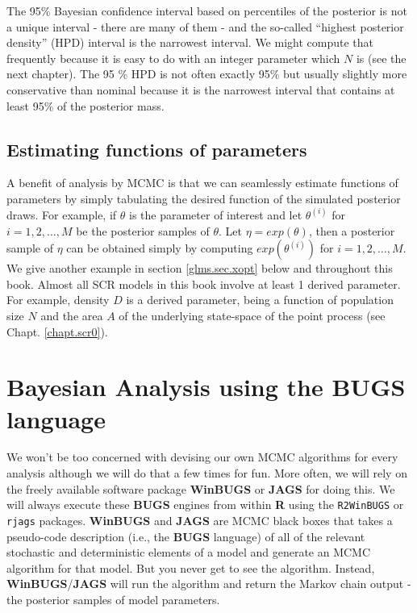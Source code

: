 The 95\% Bayesian confidence interval based on percentiles of the posterior
is not a unique interval - there are many of them - and the so-called
``highest posterior density'' (HPD) interval is the narrowest
interval. We might compute that frequently because it is easy to do
with an integer parameter which $N$ is (see the next chapter). The
95 \% HPD is not often exactly 95\% but usually slightly more
conservative than nominal because it is the narrowest interval that
contains at least 95\%  of the posterior mass.

\subsection{Estimating functions of parameters}

A benefit of analysis by MCMC is that we can seamlessly estimate
functions of parameters by simply tabulating the desired function of
the simulated posterior draws. For example, if $\theta$ is the
parameter of interest and let $\theta^{(i)}$ for $i=1,2,\ldots,M$ be
the posterior samples of $\theta$. Let $\eta = exp(\theta)$, then a
posterior sample of $\eta$ can be obtained simply by computing
$exp(\theta^{(i)})$ for $i=1,2,\ldots,M$. We give another example in
section
\ref{glms.sec.xopt}
below and throughout this book.
Almost all SCR models in this book involve at least 1 derived
parameter. For example, density $D$ is a derived parameter, being a
function of population size $N$ and the area $A$ of the underlying
state-space of the point process (see Chapt. \ref{chapt.scr0}).

\section{Bayesian Analysis using the BUGS language}

We won't be too concerned with devising our own MCMC algorithms for
every analysis
although we will do that a few times for fun.  More often, we
will rely on the freely available software package {\bf WinBUGS} or
{\bf JAGS}
for doing this.  We will always execute these {\bf BUGS} engines from
within {\bf R} using the \mbox{\tt R2WinBUGS} \citep{sturtz_etal:2005}
or 
\mbox{\tt rjags} \citep{plummer:2009} packages. 
{\bf WinBUGS} and {\bf JAGS} are  MCMC black boxes
that takes a pseudo-code description (i.e., the {\bf BUGS}
language) of all of the relevant stochastic
and deterministic elements of a model and generate an MCMC algorithm
for that model. But you never get to see the algorithm. Instead,
{\bf WinBUGS}/{\bf JAGS} will run the 
algorithm and  return the Markov chain output
- the posterior samples of model parameters.


